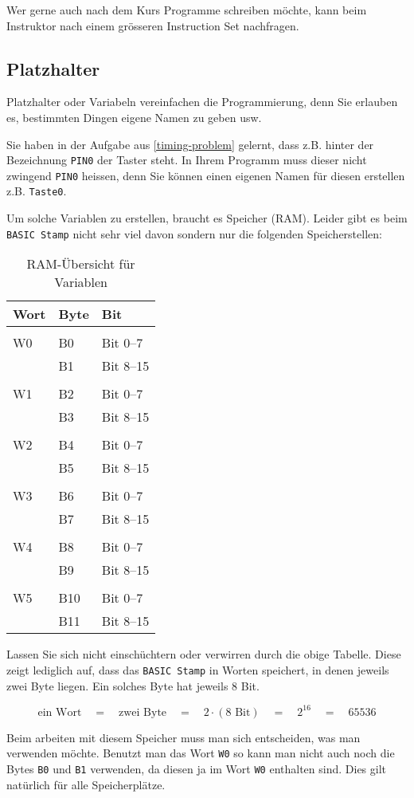\noindent
Wer gerne auch nach dem Kurs Programme schreiben möchte, kann beim Instruktor 
nach einem grösseren Instruction Set nachfragen.

\newpage
\subsection{Platzhalter}\label{Platzhalter}
Platzhalter oder Variabeln vereinfachen die Programmierung, denn Sie
erlauben es, bestimmten Dingen eigene Namen zu geben usw.

Sie haben in der Aufgabe aus \ref{timing-problem}
gelernt, dass z.B. hinter der Bezeichnung \lstinline{PIN0} der Taster
steht. In Ihrem Programm muss dieser nicht zwingend \lstinline{PIN0}
heissen, denn Sie können einen eigenen Namen für diesen erstellen
z.B. \lstinline{Taste0}.

Um solche Variablen zu erstellen, braucht es Speicher (RAM).
Leider gibt es beim \verb!BASIC Stamp! nicht sehr viel davon sondern
nur die folgenden Speicherstellen:

\begin{table}[h!]
\centering
\begin{tabular}{lll}
\textbf{Wort} & \textbf{Byte} & \textbf{Bit} \\
\hline 
&&\\
W0 	& B0 	& Bit 0--7 		\\
	& B1 	& Bit 8--15 	\\
&&\\
W1	& B2	& Bit 0--7 		\\
	& B3	& Bit 8--15 	\\
&&\\
W2 	& B4 	& Bit 0--7 		\\
	& B5 	& Bit 8--15 	\\
&&\\
W3	& B6	& Bit 0--7 		\\
	& B7	& Bit 8--15 	\\
&&\\
W4 	& B8 	& Bit 0--7 		\\
	& B9 	& Bit 8--15 	\\
&&\\
W5	& B10	& Bit 0--7 		\\
	& B11	& Bit 8--15 	\\
\end{tabular}
\caption{RAM-Übersicht für Variablen}
\end{table}

\noindent
Lassen Sie sich nicht einschüchtern oder verwirren durch die obige Tabelle.
Diese zeigt lediglich auf, dass das \verb|BASIC Stamp| in Worten speichert,
in denen jeweils zwei Byte liegen. Ein solches Byte hat jeweils 8 Bit.

\[ \text{ein Wort} \quad 
   = \quad \text{zwei Byte} \quad
   = \quad 2 \cdot (\text{8 Bit}) \quad
   = \quad 2^{16} \quad
   = \quad 65536 \]

\noindent
Beim arbeiten mit diesem Speicher muss man sich entscheiden, was man verwenden
möchte. Benutzt man das Wort \lstinline{W0} so kann man nicht auch noch die
Bytes \lstinline{B0} und \lstinline{B1} verwenden, da diesen ja im Wort
\lstinline{W0} enthalten sind. Dies gilt natürlich für alle Speicherplätze.